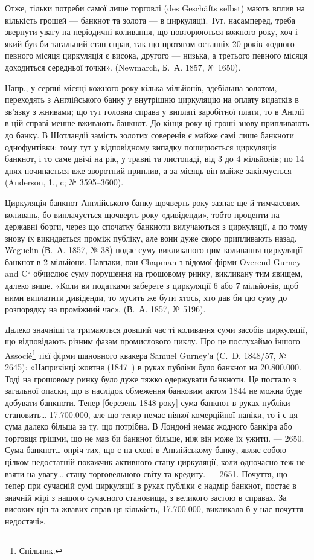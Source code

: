 Отже, тільки потреби самої лише торговлі (des Geschäfts selbst) мають
вплив на кількість грошей — банкнот та золота — в циркуляції. Тут, насамперед,
треба звернути увагу на періодичні коливання, що-повторюються кожного року,
хоч і який був би загальний стан справ, так що протягом останніх 20 років
«одного певного місяця циркуляція є висока, другого — низька, а третього певного
місяця доходиться середньої точки». (Newmarch, Б.~А. 1857, № 1650).

Напр., у серпні місяці кожного року кілька мільйонів, здебільша золотом,
переходять з Англійського банку у внутрішню циркуляцію на оплату видатків
в зв’язку з жнивами; що тут головна справа у виплаті заробітної плати, то
в Англії в цій справі менше вживають банкнот. До кінця року ці гроші знову
припливають до банку. В Шотландії замість золотих соверенів є майже самі лише
банкноти однофунтівки; тому тут у відповідному випадку поширюється циркуляція
банкнот, і то саме двічі на рік, у травні та листопаді, від 3 до 4 мільйонів;
по 14 днях починається вже зворотний приплив, а за місяць він майже закінчується
(Anderson, 1., c; № 3595--3600).

Циркуляція банкнот Англійського банку щочверть року зазнає ще й
тимчасових коливань, бо виплачується щочверть року «дивіденди», тобто проценти
на державні борги, через що спочатку банкноти вилучаються з циркуляції,
а по тому знову їх викидається проміж публіку, але вони дуже скоро припливають
назад. Weguelin (В.~А. 1857, № 38) подає суму викликаного цим коливання
циркуляції банкнот в 2 мільйони. Навпаки, пан Chapman з відомої фірми
Overend Gurney and C° обчислює суму порушення на грошовому ринку, викликану
тим явищем, далеко вище. «Коли ви податками заберете з циркуляції 6 або
7 мільйонів, щоб ними виплатити дивіденди, то мусить же бути хтось, хто дав
би цю суму до розпорядку на проміжний час». (В.~А. 1857, № 5196).

Далеко значніші та тримаються довший час ті коливання суми засобів
циркуляції, що відповідають різним фазам промислового циклу. Про це послухаймо
іншого Associé\footnote*{
Спільник. 
} тієї фірми шановного квакера Samuel Gurney’я (C.~D.
1848/57, № 2645): «Наприкінці жовтня (1847~) в руках публіки було банкнот
на \num{20.800.000}. Тоді на грошовому ринку було дуже тяжко одержувати
банкноти. Це постало з загальної опаски, що в наслідок обмеження банковим
актом 1844 не можна буде добувати банкноти. Тепер [березень 1848 року] сума
банкнот в руках публіки становить\dots{} \num{17.700.000}, але що тепер немає
ніякої комерційної паніки, то і є ця сума далеко більша за ту, що потрібна.
В Лондоні немає жодного банкіра або торговця грішми, що не мав би банкнот
більше, ніж він може їх ужити. — 2650. Сума банкнот\dots{} опріч тих, що є на
схові в Англійському банку, являє собою цілком недостатній покажчик активного
стану циркуляції, коли одночасно теж не взяти на увагу\dots{} стану торговельного
світу та кредиту. — 2651. Почуття, що тепер при сучасній сумі циркуляції в
руках публіки є надмір банкнот, постає в значній мірі з нашого сучасного становища,
з великого застою в справах. За високих цін та жвавих справ ця
кількість, \num{17.700.000}, викликала б у нас почуття недостачі».
